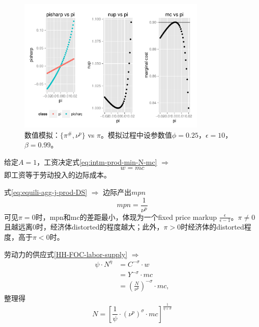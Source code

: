 \begin{figure}[p]
  \centering
  \includegraphics[width=0.8\textwidth]{Figures/R-simul-pi-pisharp-nup.pdf}
  \caption{数值模拟：$\{\pi^{\#},\nu^p\}$ vs $\pi$。模拟过程中设参数值$\phi=0.25$，$\epsilon=10$， $\beta = 0.99$。}
  \label{fig:simul-pi-pisharp-nup}
\end{figure}

给定$A=1$，工资决定式\eqref{eq:intm-prod-min-N-mc} $\Rightarrow$
\begin{equation}
  \label{eq:ss-wage}
  w = mc
\end{equation}
即工资等于劳动投入的边际成本。

式\eqref{eq:equili-agg-j-prod-DS} $\Rightarrow$ 边际产出$mpn$
\begin{equation}
  \label{eq:ss-mpn}
  mpn = \frac{1}{\nu^p}
\end{equation}
可见$\pi=0$时，mpn和mc的差距最小，体现为一个fixed price markup $\frac{\epsilon}{\epsilon -1}$。$\pi \neq 0$且越远离0时，经济体distorted的程度越大；此外，$\pi>0$时经济体的distorted程度，高于$\pi<0$时。

劳动力的供应式\eqref{HH-FOC-labor-supply} $\Rightarrow$
\begin{align*}
  \psi \cdot N^{\eta} &= C^{-\sigma} \cdot w \\
                      &= Y^{-\sigma} \cdot mc \\
                      &= \left(\frac{N}{\nu^p}\right)^{-\sigma} \cdot mc,
\end{align*}
整理得
\begin{equation}
  \label{eq:ss-labor-supply}
  N = \left[ \frac{1}{\psi} \cdot \left( \nu^p \right)^{\sigma} \cdot mc \right] ^{\frac{1}{\eta + \sigma}}
\end{equation}

